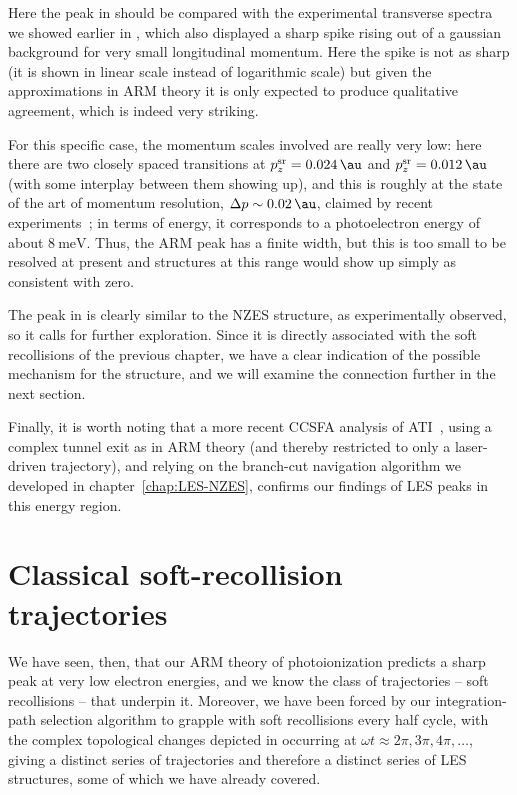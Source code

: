 Here the peak in  should be compared with the experimental transverse spectra we showed earlier in , which also displayed a sharp spike rising out of a gaussian background for very small longitudinal momentum. Here the spike is not as sharp (it is shown in linear scale instead of logarithmic scale) but given the approximations in ARM theory it is only expected to produce qualitative agreement, which is indeed very striking. 

For this specific case, the momentum scales involved are really very low: here there are two closely spaced transitions at $\pzsr{}= \SI{ \figuresixtwoBfirstpztransition }{\au}$ and $\pzsr{}=\SI{\figuresixtwoBthirdpztransition}{\au}$ (with some interplay between them showing up), and this is roughly at the state of the art of momentum resolution, $\Delta p\sim\SI{0.02}{\au}$, claimed by recent experiments~\cite{ pullen_kinematically_2014, Wolter_PRX}; in terms of energy, it corresponds to a photoelectron energy of about $\SI{8}{\milli\electronvolt}$. Thus, the ARM peak has a finite width, but this is too small to be resolved at present and structures at this range would show up simply as consistent with zero.


The peak in  is clearly similar to the NZES structure, as experimentally observed, so it calls for further exploration. Since it is directly associated with the soft recollisions of the previous chapter, we have a clear indication of the possible mechanism for the structure, and we will examine the connection further in the next section.




Finally, it is worth noting that a more recent CCSFA analysis of ATI~\cite{ keil_branch-cuts_2016}, using a complex tunnel exit as in ARM theory (and thereby restricted to only a laser-driven trajectory), and relying on the branch-cut navigation algorithm we developed in chapter~\ref{chap:LES-NZES}, confirms our findings of LES peaks in this energy region.









\section{Classical soft-recollision trajectories}
\label{sec:classical-soft-recollisions}
We have seen, then, that our ARM theory of photoionization predicts a sharp peak at very low electron energies, and we know the class of trajectories -- soft recollisions -- that underpin it. Moreover, we have been forced by our integration-path selection algorithm to grapple with soft recollisions every half cycle, with the complex topological changes depicted in  occurring at $\omega t\approx 2\pi,3\pi,4\pi,\ldots$, giving a distinct series of trajectories and therefore a distinct series of LES structures, some of which we have already covered.

